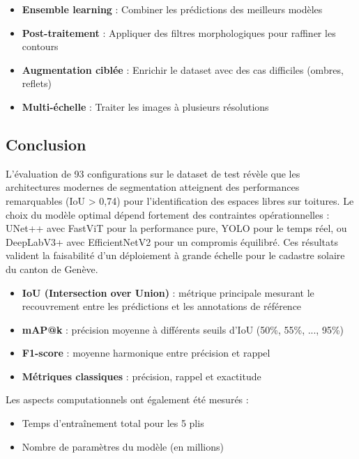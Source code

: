 \begin{itemize}
    \item \textbf{Ensemble learning} : Combiner les prédictions des meilleurs modèles
    \item \textbf{Post-traitement} : Appliquer des filtres morphologiques pour raffiner les contours
    \item \textbf{Augmentation ciblée} : Enrichir le dataset avec des cas difficiles (ombres, reflets)
    \item \textbf{Multi-échelle} : Traiter les images à plusieurs résolutions
\end{itemize}

\subsection{Conclusion}

L'évaluation de 93 configurations sur le dataset de test révèle que les architectures modernes de segmentation atteignent des performances remarquables (IoU > 0,74) pour l'identification des espaces libres sur toitures. Le choix du modèle optimal dépend fortement des contraintes opérationnelles : UNet++ avec FastViT pour la performance pure, YOLO pour le temps réel, ou DeepLabV3+ avec EfficientNetV2 pour un compromis équilibré. Ces résultats valident la faisabilité d'un déploiement à grande échelle pour le cadastre solaire du canton de Genève.

\begin{itemize}
    \item \textbf{IoU (Intersection over Union)} : métrique principale mesurant le recouvrement entre les prédictions et les annotations de référence
    \item \textbf{mAP@k} : précision moyenne à différents seuils d'IoU (50\%, 55\%, ..., 95\%)
    \item \textbf{F1-score} : moyenne harmonique entre précision et rappel
    \item \textbf{Métriques classiques} : précision, rappel et exactitude
\end{itemize}

Les aspects computationnels ont également été mesurés :
\begin{itemize}
    \item Temps d'entraînement total pour les 5 plis
    \item Nombre de paramètres du modèle (en millions)
\end{itemize}









